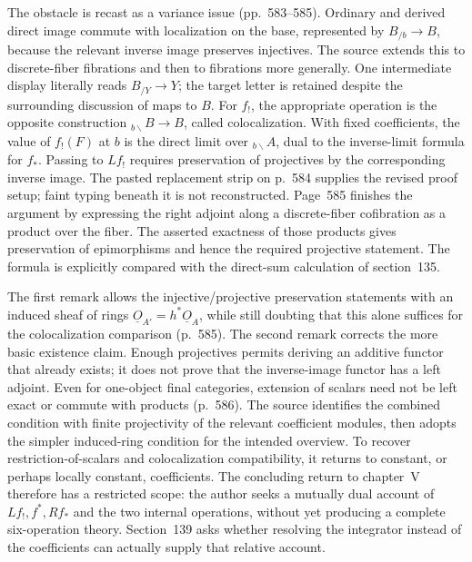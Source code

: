 The obstacle is recast as a variance issue (pp.~583--585). Ordinary and derived direct image commute with localization on the base, represented by $B_{/b}\to B$, because the relevant inverse image preserves injectives. The source extends this to discrete-fiber fibrations and then to fibrations more generally. One intermediate display literally reads $B_{/Y}\to Y$; the target letter is retained despite the surrounding discussion of maps to $B$. For $f_!$, the appropriate operation is the opposite construction ${}_{b\backslash}B\to B$, called colocalization. With fixed coefficients, the value of $f_!(F)$ at $b$ is the direct limit over ${}_{b\backslash}A$, dual to the inverse-limit formula for $f_*$. Passing to $Lf_!$ requires preservation of projectives by the corresponding inverse image. The pasted replacement strip on p.~584 supplies the revised proof setup; faint typing beneath it is not reconstructed. Page~585 finishes the argument by expressing the right adjoint along a discrete-fiber cofibration as a product over the fiber. The asserted exactness of those products gives preservation of epimorphisms and hence the required projective statement. The formula is explicitly compared with the direct-sum calculation of section~135.

The first remark allows the injective/projective preservation statements with an induced sheaf of rings $\underline O_{A'}=h^*\underline O_A$, while still doubting that this alone suffices for the colocalization comparison (p.~585). The second remark corrects the more basic existence claim. Enough projectives permits deriving an additive functor that already exists; it does not prove that the inverse-image functor has a left adjoint. Even for one-object final categories, extension of scalars need not be left exact or commute with products (p.~586). The source identifies the combined condition with finite projectivity of the relevant coefficient modules, then adopts the simpler induced-ring condition for the intended overview. To recover restriction-of-scalars and colocalization compatibility, it returns to constant, or perhaps locally constant, coefficients. The concluding return to chapter~V therefore has a restricted scope: the author seeks a mutually dual account of $Lf_!,f^*,Rf_*$ and the two internal operations, without yet producing a complete six-operation theory. Section~139 asks whether resolving the integrator instead of the coefficients can actually supply that relative account.
